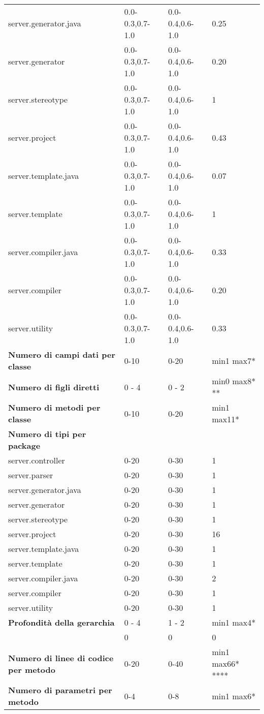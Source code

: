 \begin{longtable}{|p{5.5cm}|p{2.25cm}|p{2.25cm}|p{2.25cm}|}
		server.generator.java &0.0-0.3,0.7-1.0 &0.0-0.4,0.6-1.0 &0.25\\
		server.generator &0.0-0.3,0.7-1.0 &0.0-0.4,0.6-1.0 &0.20\\
		server.stereotype &0.0-0.3,0.7-1.0 &0.0-0.4,0.6-1.0 &1\\
		server.project &0.0-0.3,0.7-1.0 &0.0-0.4,0.6-1.0 &0.43\\
		server.template.java &0.0-0.3,0.7-1.0 &0.0-0.4,0.6-1.0 &0.07\\
		server.template &0.0-0.3,0.7-1.0 &0.0-0.4,0.6-1.0 &1\\
		server.compiler.java &0.0-0.3,0.7-1.0 &0.0-0.4,0.6-1.0 &0.33\\
		server.compiler &0.0-0.3,0.7-1.0 &0.0-0.4,0.6-1.0 &0.20\\
		server.utility &0.0-0.3,0.7-1.0 &0.0-0.4,0.6-1.0 &0.33\\
		\hline
		\textbf{Numero di campi dati per classe} &0-10 &0-20 &min1 max7*\\
		\hline
		\textbf{Numero di figli diretti} &0 - 4 &0 - 2 &min0 max8* **\\
		\hline
		\textbf{Numero di metodi per classe} &0-10 &0-20 &min1 max11*\\
		\hline
		\textbf{Numero di tipi per package} & & &\\
		server.controller &0-20 &0-30 &1\\
		server.parser &0-20 &0-30 &1\\
		server.generator.java &0-20 &0-30 &1\\
		server.generator &0-20 &0-30 &1\\
		server.stereotype &0-20 &0-30 &1\\
		server.project &0-20 &0-30 &16\\
		server.template.java &0-20 &0-30 &1\\
		server.template &0-20 &0-30 &1\\
		server.compiler.java &0-20 &0-30 &2\\
		server.compiler &0-20 &0-30 &1\\
		server.utility &0-20 &0-30 &1\\
		\hline
		\textbf{Profondità della gerarchia} &0 - 4 &1 - 2 &min1 max4*\\
		&0 &0 &0\\
		\hline
		\textbf{Numero di linee di codice per metodo} &0-20 &0-40 &min1 max66* ****\\
		\hline
		\textbf{Numero di parametri per metodo} &0-4 &0-8 &min1 max6*\\

\end{longtable}
